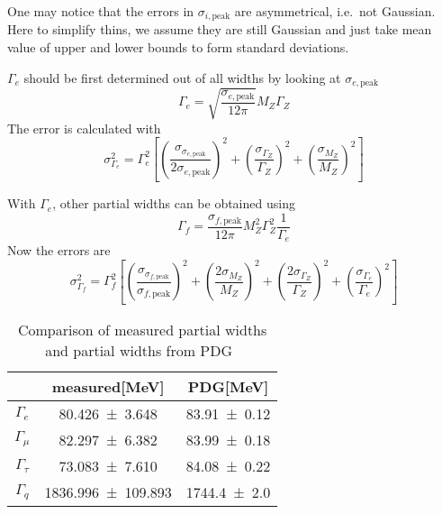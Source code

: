 One may notice that the errors in $\sigma_{i, \text{peak}}$ are asymmetrical, i.e.~not Gaussian. Here to simplify thins, we assume they are still Gaussian and just take mean value of upper and lower bounds to form standard deviations.


$\Gamma_e$ should be first determined out of all widths by looking at $\sigma_{e,\text{peak}}$
\begin{equation}
	\Gamma_e = \sqrt{\frac{\sigma_{e, \text{peak}}}{12\pi}} M_Z \Gamma_Z  
\end{equation}
The error is calculated with
\begin{equation*}
	\sigma_{\Gamma_e}^2 = \Gamma_e^2 \left[ \left( \frac{\sigma_{\sigma_{e, \text{peak}}}}{2 \sigma_{e, \text{peak}}} \right)^2 + \left( \frac{\sigma_{\Gamma_Z}}{\Gamma_Z} \right)^2 + \left( \frac{\sigma_{M_Z}}{M_Z} \right)^2 \right]
\end{equation*}

With $\Gamma_e$, other partial widths can be obtained using
\begin{equation}
	\Gamma_f = \frac{\sigma_{f,\text{peak}}}{12\pi} M_Z^2 \Gamma_Z^2 \frac{1}{\Gamma_e}	
\end{equation}
Now the errors are
\begin{equation*}
	\sigma_{\Gamma_f}^2 = \Gamma_f^2 \left[ \left( \frac{\sigma_{\sigma_{f,\text{peak}}}}{\sigma_{f, \text{peak}}} \right)^2 + \left( \frac{2\sigma_{M_Z}}{M_Z} \right)^2 + \left( \frac{2\sigma_{\Gamma_Z}}{\Gamma_Z} \right)^2 + \left( \frac{\sigma_{\Gamma_e}}{\Gamma_e} \right)^2 \right]
\end{equation*}

\begin{table}[ht]
	\centering	
	\begin{tabular}{ccc} 
		\toprule
	& measured[\si{\mega\eV}] & PDG[\si{\mega\eV}] \\
	\midrule
		$\Gamma_e$ & \num{80.426 +- 3.648} & \num{83.91+-0.12} \\
		$\Gamma_\mu$ & \num{82.297 +- 6.382} & \num{83.99 +- 0.18} \\
		$\Gamma_\tau$ & \num{73.083 +- 7.610} & \num{84.08 +- 0.22}\\
		$\Gamma_q$ & \num{1836.996 +- 109.893} & \num{1744.4 +- 2.0} \\
	\bottomrule
	\end{tabular}
	\caption{Comparison of measured partial widths and partial widths from PDG~\cite{PDG}\label{tab:Gammas}}
\end{table}

